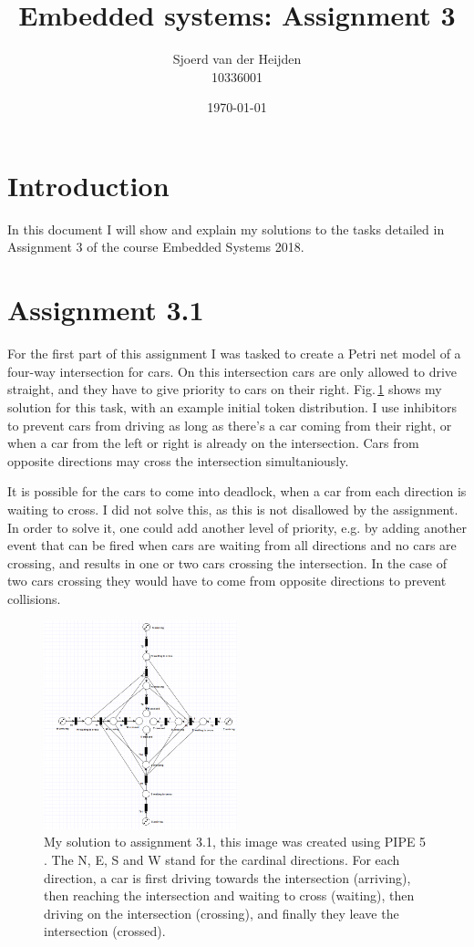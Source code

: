 \documentclass{article}
\title{Embedded systems: Assignment 3}
\date{\today}
\author{Sjoerd van der Heijden \\ 10336001}
\begin{document}
	\maketitle
	\tableofcontents
	\section{Introduction}
	\par In this document I will show and explain my solutions to the tasks detailed in Assignment 3 of the course Embedded Systems 2018.
	
	\section{Assignment 3.1}
	\par For the first part of this assignment I was tasked to create a Petri net model of a four-way intersection for cars. On this intersection cars are only allowed to drive straight, and they have to give priority to cars on their right. 	Fig.\,\ref{fig:ass3_1} shows my solution for this task, with an example initial token distribution. I use inhibitors to prevent cars from driving as long as there's a car coming from their right, or when a car from the left or right is already on the intersection. Cars from opposite directions may cross the intersection simultaniously.
	\par It is possible for the cars to come into deadlock, when a car from each direction is waiting to cross. I did not solve this, as this is not disallowed by the assignment. In order to solve it, one could add another level of priority, e.g. by adding another event that can be fired when cars are waiting from all directions and no cars are crossing, and results in one or two cars crossing the intersection. In the case of two cars crossing they would have to come from opposite directions to prevent collisions.	
	
	\begin{figure}
		\includegraphics[width=0.5\textwidth]{Ass3_1}
		\caption{My solution to assignment 3.1, this image was created using PIPE 5 \cite{dingle2009pipe2, bonet2007pipe}. The N, E, S and W stand for the cardinal directions. For each direction, a car is first driving towards the intersection (arriving), then reaching the intersection and waiting to cross (waiting), then driving on the intersection (crossing), and finally they leave the intersection (crossed). \label{fig:ass3_1}}
	\end{figure}
	
\end{document}
